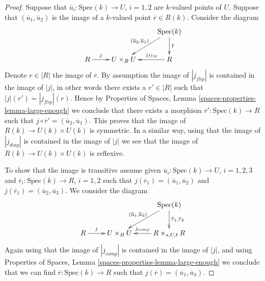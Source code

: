 \begin{proof}
Suppose that $\overline{u}_i : \text{Spec}(k) \to U$, $i = 1, 2$
are $k$-valued points of $U$. Suppose that $(\overline{u}_1, \overline{u}_2)$
is the image of a $k$-valued point $\overline{r} \in R(k)$. Consider the
diagram
$$
\xymatrix{
& &
\text{Spec}(k) \ar[d]^{\overline{r}}
\ar[ld]_{(\overline{u}_2, \overline{u}_1)} \\
R \ar[r]^-j &
U \times_B U &
R \ar[l]_-{j_{flip}}
}
$$
Denote $r \in |R|$ the image of $\overline{r}$.
By assumption the image of $|j_{flip}|$ is contained in the image of
$|j|$, in other words there exists a $r' \in |R|$ such that
$|j|(r') = |j_{flip}|(r)$. Hence by
Properties of Spaces, Lemma \ref{spaces-properties-lemma-large-enough}
we conclude that there exists a morphism
$\overline{r}' : \text{Spec}(k) \to R$ such that
$j \circ \overline{r}' = (\overline{u}_2, \overline{u}_1)$.
This proves that the image of $R(k) \to U(k) \times U(k)$ is symmetric.
In a similar way, using that the image of $|j_{diag}|$ is contained
in the image of $|j|$ we see that the image of $R(k) \to U(k) \times U(k)$ is
reflexive.

\medskip\noindent
To show that the image is transitive assume given
$\overline{u}_i : \text{Spec}(k) \to U$, $i = 1, 2, 3$
and $\overline{r}_i : \text{Spec}(k) \to R$, $i = 1, 2$ such that
$j(\overline{r}_1) = (\overline{u}_1, \overline{u}_2)$ and
$j(\overline{r}_1) = (\overline{u}_2, \overline{u}_3)$.
We consider the diagram
$$
\xymatrix{
& &
\text{Spec}(k)
\ar[d]^{\overline{r}_1, \overline{r}_2}
\ar[ld]_{(\overline{u}_1, \overline{u}_3)} \\
R \ar[r]^-j &
U \times_B U &
R \times_{s, U, t} R \ar[l]_-{j_{comp}}
}
$$
Again using that the image of $|j_{comp}|$ is contained in the image
of $|j|$, and using
Properties of Spaces, Lemma \ref{spaces-properties-lemma-large-enough}
we conclude that we can find $\overline{r} : \text{Spec}(k) \to R$
such that $j(\overline{r}) = (\overline{u}_1, \overline{u}_3)$.
\end{proof}












